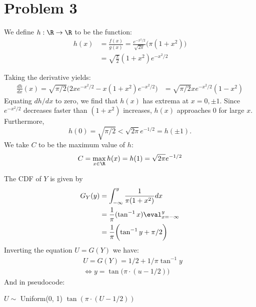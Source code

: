 \documentclass{homework}
\begin{document}
\section{Problem 3}
\begin{letterenum}
\item We define $h: \R \to \R$ to be the function:
\begin{align*}
    h(x) &= \frac{f(x)}{g(x)} = \frac{e^{-x^2/2}}{\sqrt{2\pi}} \bigl(\pi(1 + x^2)\bigr) \\
        &= \sqrt{\frac{\pi}{2}} (1 + x^2) e^{-x^2/2}
\end{align*}

Taking the derivative yields:
\begin{align*}
    \frac{dh}{dx}(x) = \sqrt{\pi/2} \biggl(
        2x e^{-x^2/2} - x(1 + x^2) e^{-x^2/2}
    \biggr)
    &= \sqrt{\pi/2} x e^{-x^2/2} (1 - x^2)
\end{align*}
Equating $dh/dx$ to zero, we find that $h(x)$ has extrema at $x=0,\pm 1$.
Since $e^{-x^2/2}$ decreases faster than $(1+x^2)$ increases, $h(x)$ approaches
0 for large $x$. Furthermore,
\begin{equation*}
    h(0) = \sqrt{\pi/2} < \sqrt{2\pi}e^{-1/2} = h(\pm1).
\end{equation*}
We take $C$ to be the maximum value of $h$:
\begin{equation*}
    C = \max_{x\in\R} h(x) = h(1) = \sqrt{2\pi}e^{-1/2}
\end{equation*}

\item The CDF of $Y$ is given by
\begin{align*}
    G_Y(y) &= \int_{-\infty}^{y} \frac{1}{\pi(1 + x^2)} dx \\
        &= \frac{1}{\pi}(\tan^{-1}x) \eval_{x=-\infty}^y \\
        &= \frac{1}{\pi} \biggl(\tan^{-1}y + \pi/2 \biggr)
\end{align*}
Inverting the equation $U = G(Y)$ we have:
\begin{align*}
    &U = G(Y) = 1/2 + 1/\pi \tan^{-1} y \\
    &\Leftrightarrow y = \tan \biggl(\pi \cdot (u - 1/2)\biggr)
\end{align*}
And in pseudocode:
\begin{algorithmic}
        \State $U \sim $ Uniform(0, 1)
        \State \Return $\tan (\pi \cdot(U - 1/2))$
    \EndFunction
\end{algorithmic}


\end{letterenum}
\end{document}
